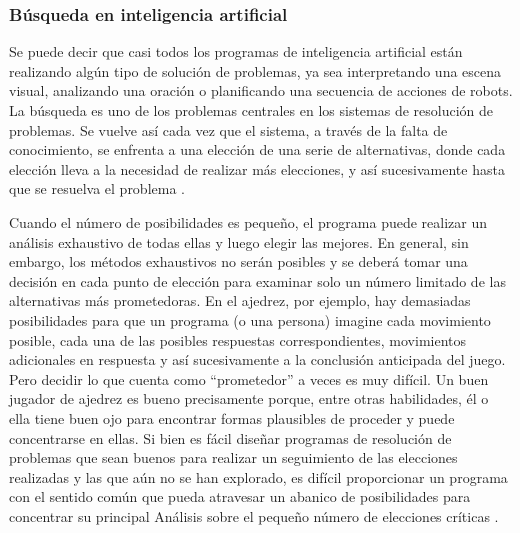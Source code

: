 \subsubsection{Búsqueda en inteligencia artificial}
Se puede decir que casi todos los programas de inteligencia artificial están realizando algún tipo de solución de problemas, ya sea interpretando una escena visual, analizando una oración o planificando una secuencia de acciones de robots. La búsqueda es uno de los problemas centrales en los sistemas de resolución de problemas. Se vuelve así cada vez que el sistema, a través de la falta de conocimiento, se enfrenta a una elección de una serie de alternativas, donde cada elección lleva a la necesidad de realizar más elecciones, y así sucesivamente hasta que se resuelva el problema \cite{Thornton1992ArtificialSearch}. 

Cuando el número de posibilidades es pequeño, el programa puede realizar un análisis exhaustivo de todas ellas y luego elegir las mejores. En general, sin embargo, los métodos exhaustivos no serán posibles y se deberá tomar una decisión en cada punto de elección para examinar solo un número limitado de las alternativas más prometedoras. En el ajedrez, por ejemplo, hay demasiadas posibilidades para que un programa (o una persona) imagine cada movimiento posible, cada una de las posibles respuestas correspondientes, movimientos adicionales en respuesta y así sucesivamente a la conclusión anticipada del juego. Pero decidir lo que cuenta como “prometedor” a veces es muy difícil. Un buen jugador de ajedrez es bueno precisamente porque, entre otras habilidades, él o ella tiene buen ojo para encontrar formas plausibles de proceder y puede concentrarse en ellas. Si bien es fácil diseñar programas de resolución de problemas que sean buenos para realizar un seguimiento de las elecciones realizadas y las que aún no se han explorado, es difícil proporcionar un programa con el sentido común que pueda atravesar un abanico de posibilidades para concentrar su principal Análisis sobre el pequeño número de elecciones críticas \cite{Thornton1992ArtificialSearch}.

